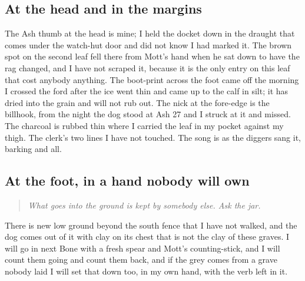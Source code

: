 \documentclass{design/chronicle}
\begin{document}
\subsection*{At the head and in the margins}

The Ash thumb at the head is mine; I held the docket down in the draught that comes under the watch-hut door and did not know I had marked it. The brown spot on the second leaf fell there from Mott’s hand when he sat down to have the rag changed, and I have not scraped it, because it is the only entry on this leaf that cost anybody anything. The boot-print across the foot came off the morning I crossed the ford after the ice went thin and came up to the calf in silt; it has dried into the grain and will not rub out. The nick at the fore-edge is the billhook, from the night the dog stood at Ash 27 and I struck at it and missed. The charcoal is rubbed thin where I carried the leaf in my pocket against my thigh. The clerk’s two lines I have not touched. The song is as the diggers sang it, barking and all.

\subsection*{At the foot, in a hand nobody will own}

\begin{quote}\itshape What goes into the ground is kept by somebody else. Ask the jar.\end{quote}

There is new low ground beyond the south fence that I have not walked, and the dog comes out of it with clay on its chest that is not the clay of these graves. I will go in next Bone with a fresh spear and Mott’s counting-stick, and I will count them going and count them back, and if the grey comes from a grave nobody laid I will set that down too, in my own hand, with the verb left in it.
\end{document}
